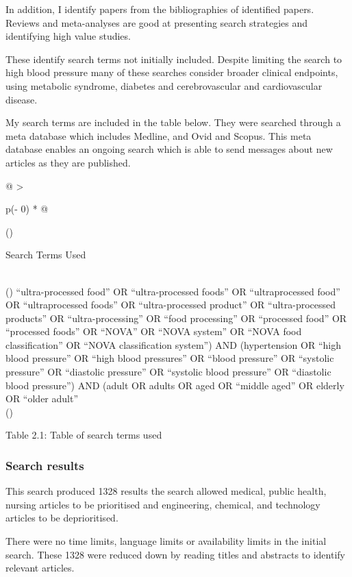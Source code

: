 \documentclass[
]{article}
\begin{document}
In addition, I identify papers from the bibliographies of identified
papers. Reviews and meta-analyses are good at presenting search
strategies and identifying high value studies.

These identify search terms not initially included. Despite limiting the
search to high blood pressure many of these searches consider broader
clinical endpoints, using metabolic syndrome, diabetes and
cerebrovascular and cardiovascular disease.

My search terms are included in the table below. They were searched
through a meta database which includes Medline, and Ovid and Scopus.
This meta database enables an ongoing search which is able to send
messages about new articles as they are published.

\begin{longtable}[]{@{}
  >{\raggedright\arraybackslash}p{(\columnwidth - 0\tabcolsep) * }@{}}
\toprule()
\begin{minipage}[b]{\linewidth}\raggedright
Search Terms Used
\end{minipage} \\
\midrule()
\endhead
``ultra-processed food'' OR ``ultra-processed foods'' OR
``ultraprocessed food'' OR ``ultraprocessed foods'' OR ``ultra-processed
product'' OR ``ultra-processed products'' OR ``ultra-processing'' OR
``food processing'' OR ``processed food'' OR ``processed foods'' OR
``NOVA'' OR ``NOVA system'' OR ``NOVA food classification'' OR ``NOVA
classification system'') AND (hypertension OR ``high blood pressure'' OR
``high blood pressures'' OR ``blood pressure'' OR ``systolic pressure''
OR ``diastolic pressure'' OR ``systolic blood pressure'' OR ``diastolic
blood pressure'') AND (adult OR adults OR aged OR ``middle aged'' OR
elderly OR ``older adult'' \\
\bottomrule()
\end{longtable}

Table 2.1: Table of search terms used

\hypertarget{search-results}{%
\subsubsection{Search results}\label{search-results}}

This search produced 1328 results the search allowed medical, public
health, nursing articles to be prioritised and engineering, chemical,
and technology articles to be deprioritised.

There were no time limits, language limits or availability limits in the
initial search. These 1328 were reduced down by reading titles and
abstracts to identify relevant articles.
\end{document}
